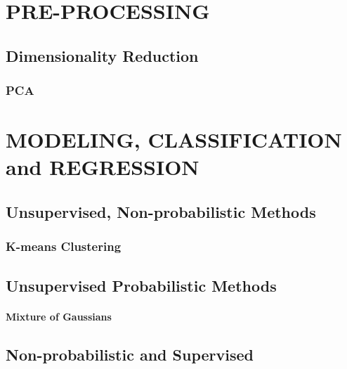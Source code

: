 \documentclass{book}
\begin{document}
\part{\color{red}PRE-PROCESSING}
\chapter{Dimensionality Reduction}
\section{PCA}

\part{\color{red}MODELING, CLASSIFICATION and REGRESSION}

\chapter{Unsupervised, Non-probabilistic Methods}

\section{K-means Clustering}

\chapter{Unsupervised Probabilistic Methods}


\subsection{Mixture of Gaussians}



\chapter{Non-probabilistic and Supervised}
\end{document}
